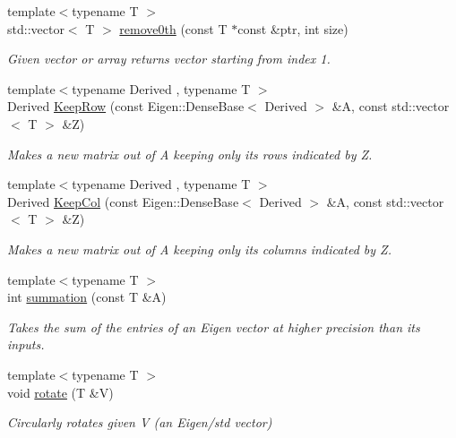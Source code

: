 \begin{DoxyCompactItemize}
\item 
{\footnotesize template$<$typename T $>$ }\\std\+::vector$<$ T $>$ \hyperlink{namespaceMackey_abb4d03d1e773bb1004e3b41737ef2380}{remove0th} (const T $\ast$const \&ptr, int size)
\begin{DoxyCompactList}\small\item\em Given vector or array returns vector starting from index 1. \end{DoxyCompactList}\item 
{\footnotesize template$<$typename Derived , typename T $>$ }\\Derived \hyperlink{namespaceMackey_ae44b27dcf905a7ff976ebc79f197c579}{Keep\+Row} (const Eigen\+::\+Dense\+Base$<$ Derived $>$ \&A, const std\+::vector$<$ T $>$ \&Z)
\begin{DoxyCompactList}\small\item\em Makes a new matrix out of A keeping only its rows indicated by Z. \end{DoxyCompactList}\item 
{\footnotesize template$<$typename Derived , typename T $>$ }\\Derived \hyperlink{namespaceMackey_a782d9ce52543c3ae3520b4859dda3240}{Keep\+Col} (const Eigen\+::\+Dense\+Base$<$ Derived $>$ \&A, const std\+::vector$<$ T $>$ \&Z)
\begin{DoxyCompactList}\small\item\em Makes a new matrix out of A keeping only its columns indicated by Z. \end{DoxyCompactList}\item 
{\footnotesize template$<$typename T $>$ }\\int \hyperlink{namespaceMackey_a37f0a650642090aa89d5cbc89dc5d0ee}{summation} (const T \&A)
\begin{DoxyCompactList}\small\item\em Takes the sum of the entries of an Eigen vector at higher precision than its inputs. \end{DoxyCompactList}\item 
{\footnotesize template$<$typename T $>$ }\\void \hyperlink{namespaceMackey_a38a833de54971845cbdb8c96f830725b}{rotate} (T \&V)
\begin{DoxyCompactList}\small\item\em Circularly rotates given V (an Eigen/std vector) \end{DoxyCompactList}\item 

\end{DoxyCompactItemize}
